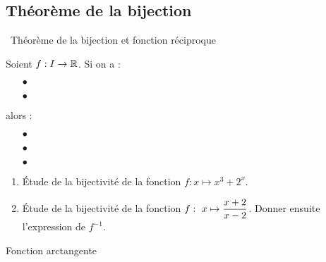 \documentclass[a4paper, 11pt]{article}
\begin{document}
{{%
\subsection{Th\'eor\`eme de la bijection}

\noindent\ {Th\'eor\`{e}me de la bijection et fonction r\'eciproque}\\

{\noindent

\begin{theorem}
	Soient $f: I\rightarrow \mathbb{R}$. Si on a : \vsec
	\begin{itemize}
		\item[$\bullet$] \dotfill\vsec
		\item[$\bullet$] \dotfill\vsec
	\end{itemize}
	alors :\vsec
	\begin{itemize}
		\item[$\bullet$] \dotfill\vsec
		\item[$\bullet$] \dotfill\vsec
		\item[$\bullet$] \dotfill\vsec
	\end{itemize}
\end{theorem}
}



{\footnotesize \begin{exercice}
	\begin{enumerate}
		\item \'Etude de la bijectivit\'e de la fonction $f: x\mapsto x^3+2^x$.
		\item \'Etude de la bijectivit\'e de la fonction $f:\ x\mapsto \displaystyle\frac{x+2}{x-2}$. Donner ensuite l'expression de $f^{-1}$.
	\end{enumerate}
\end{exercice}}

{Fonction arctangente}\\



}}
\end{document}
